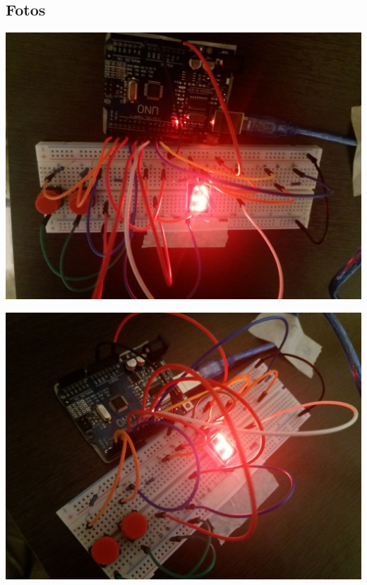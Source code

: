 \subsection{Fotos}
\begin{center}

\includegraphics[width=.8\linewidth]{imagenes/photo5008481670650767804.jpg}

\includegraphics[width=.8\linewidth]{imagenes/photo5008481670650767805.jpg}


\end{center}
